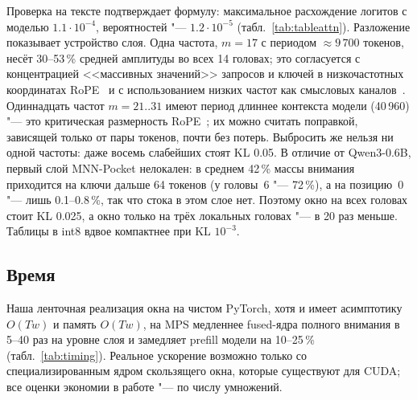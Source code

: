 Проверка на тексте подтверждает формулу: максимальное расхождение логитов с
моделью $1.1\cdot10^{-4}$, вероятностей "--- $1.2\cdot10^{-5}$
(табл.~\ref{tab:tableattn}). Разложение показывает устройство слоя. Одна
частота, $m=17$ с периодом $\approx9\,700$ токенов, несёт 30--53\,\% средней
амплитуды во всех 14 головах; это согласуется с концентрацией <<массивных
значений>> запросов и ключей в низкочастотных координатах RoPE~\cite{jin2025massive}
и с использованием низких частот как смысловых каналов~\cite{barbero2024rope}.
Одиннадцать частот $m=21..31$ имеют период длиннее контекста модели
(40\,960) "--- это критическая размерность RoPE~\cite{liu2024ropescaling}; их
можно считать поправкой, зависящей только от пары токенов, почти без потерь.
Выбросить же нельзя ни одной частоты: даже восемь слабейших стоят KL 0.05.
В отличие от Qwen3-0.6B, первый слой MNN-Pocket нелокален: в среднем 42\,\%
массы внимания приходится на ключи дальше 64 токенов (у головы~6 "--- 72\,\%),
а на позицию~0 "--- лишь 0.1--0.8\,\%, так что стока в этом слое нет. Поэтому
окно на всех головах стоит KL 0.025, а окно только на трёх локальных
головах "--- в 20 раз меньше. Таблицы в int8 вдвое компактнее при KL $10^{-3}$.

\subsection{Время}

\begin{table}[t]
\centering
\scriptsize
\setlength{\tabcolsep}{4pt}
\caption{Замер времени на Apple M4 (MPS, bf16, медиана 5 запусков):
ленточная реализация окна на чистом PyTorch против fused-ядра SDPA.}
\label{tab:timing}
\end{table}

Наша ленточная реализация окна на чистом PyTorch, хотя и имеет
асимптотику $O(Tw)$ и память $O(Tw)$, на MPS медленнее fused-ядра
полного внимания в 5--40 раз на уровне слоя и замедляет prefill модели
на 10--25\,\% (табл.~\ref{tab:timing}). Реальное ускорение возможно только
со специализированным ядром скользящего окна, которые существуют для
CUDA; все оценки экономии в работе "--- по числу умножений.
